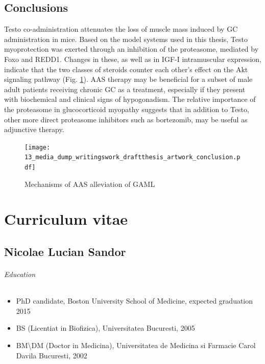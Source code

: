 \documentclass[12pt,english]{report}\usepackage[]{graphicx}\usepackage[]{color}
\begin{document}
\section{Conclusions}

Testo co-administration attenuates the loss of muscle mass induced
by GC administration in mice. Based on the model systems used in this
thesis, Testo myoprotection was exerted through an inhibition of the
proteasome, mediated by Foxo and REDD1. Changes in these, as well
as in IGF-I intramuscular expression, indicate that the two classes
of steroids counter each other’s effect on the Akt signaling pathway
(Fig. \ref{fig:Mechanisms-of-AAS}). AAS therapy may be beneficial
for a subset of male adult patients receiving chronic GC as a treatment,
especially if they present with biochemical and clinical signs of
hypogonadism. The relative importance of the proteasome in glucocorticoid
myopathy suggests that in addition to Testo, other more direct proteasome
inhibitors such as bortezomib, may be useful as adjunctive therapy.

\begin{figure}
\texttt{[image: 13\_media\_dump\_writingswork\_draftthesis\_artwork\_conclusion.pdf]}\protect\caption{Mechanisms of AAS alleviation of GAML\label{fig:Mechanisms-of-AAS}}


\end{figure}


\begin{singlespace}
\pagebreak{}
\end{singlespace}




\begin{singlespace}
\pagebreak{}
\end{singlespace}


\chapter{Curriculum vitae}


\section*{Nicolae Lucian Sandor}


\subparagraph*{Education}
\begin{itemize}
\item PhD candidate, Boston University School of Medicine, expected graduation
2015
\item BS (Licentiat in Biofizica), Universitatea Bucuresti, 2005
\item BM\textbackslash{}DM (Doctor in Medicina), Universitatea de Medicina
si Farmacie Carol Davila Bucuresti, 2002
\end{itemize}
\end{document}
